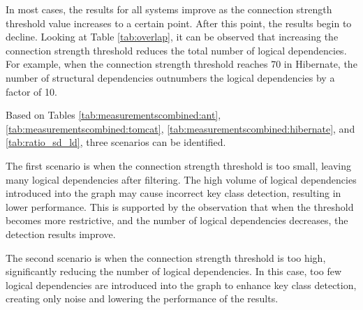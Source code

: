 \begin{table}[!h]
\setlength\tabcolsep{3.5pt}
\caption{Ratio between structural and logical dependencies (SD/LD)}
\label{tab:ratio_sd_ld}
\centering
{}
\end{table}

In most cases, the results for all systems improve as the connection strength threshold value increases to a certain point. After this point, the results begin to decline. Looking at Table \ref{tab:overlap}, it can be observed that increasing the connection strength threshold reduces the total number of logical dependencies. For example, when the connection strength threshold reaches 70 in Hibernate, the number of structural dependencies outnumbers the logical dependencies by a factor of 10.

Based on Tables \ref{tab:measurementscombined:ant}, \ref{tab:measurementscombined:tomcat}, \ref{tab:measurementscombined:hibernate}, and \ref{tab:ratio_sd_ld}, three scenarios can be identified.

The first scenario is when the connection strength threshold is too small, leaving many logical dependencies after filtering. The high volume of logical dependencies introduced into the graph may cause incorrect key class detection, resulting in lower performance. This is supported by the observation that when the threshold becomes more restrictive, and the number of logical dependencies decreases, the detection results improve.

The second scenario is when the connection strength threshold is too high, significantly reducing the number of logical dependencies. In this case, too few logical dependencies are introduced into the graph to enhance key class detection, creating only noise and lowering the performance of the results.

